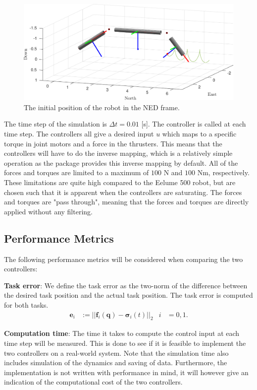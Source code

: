 \begin{figure}[h]
    \centering
    \includegraphics[width=\linewidth]{assets/plots/initial_pos.pdf}
    \caption{The initial position of the robot in the NED frame.}
    \label{fig:init_pos}
\end{figure}
The time step of the simulation is $\Delta t = 0.01$ [s]. The controller is
called at each time step. The controllers all give a desired input $u$ which
maps to a specific torque in joint motors and a force in the thrusters.
This means that the controllers will have to do the inverse mapping, which
is a relatively simple operation as the \pymuvs package provides this inverse
mapping by default. All of
the forces and torques are limited to a maximum of $100$ N and $100$ Nm, respectively.
These limitations are quite high compared to the Eelume 500 robot, but are chosen
such that it is apparent when the controllers are saturating. The forces and torques
are "pass through", meaning that the forces and torques are directly applied without
any filtering.


\subsection{Performance Metrics}
The following performance metrics will be considered when comparing the two controllers:

\textbf{Task error}: We define the task error as the two-norm of the difference
between the desired task position and the actual task position. The task error
is computed for both tasks.
\begin{align}
    \bm{e}_i &:= ||\bm{f}_i(\bm{q}) - \bm{\sigma}_i(t)||_2 &
        i &= 0, 1.
\end{align}

\textbf{Computation time}: The time it takes to compute the control input at each
time step will be measured. This is done to see if it is feasible to implement the
two controllers on a real-world system. Note that the simulation time also includes
simulation of the dynamics and saving of data. Furthermore, the implementation is
not written with performance in mind, it will however give an indication of the
computational cost of the two controllers.


